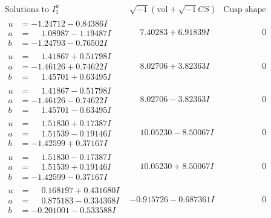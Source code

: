 \documentclass[1p]{elsarticle_modified}
\theoremstyle{definition}
\newcommand{\I}{\sqrt{-1}}
\begin{document}
$$\begin{array}{c|c|c}
 \end{array}$$\newpage$$\begin{array}{c|c|c}  
\text{Solutions to }I^u_{1}& \I (\text{vol} + \sqrt{-1}CS) & \text{Cusp shape}\\
 \hline 
\begin{aligned}
u &= -1.24712 - 0.84386 I \\
a &= \phantom{-}1.08987 - 1.19487 I \\
b &= -1.24793 - 0.76502 I\end{aligned}
 & \phantom{-}7.40283 + 6.91839 I & \phantom{-0.000000 } 0 \\ \hline\begin{aligned}
u &= \phantom{-}1.41867 + 0.51798 I \\
a &= -1.46126 + 0.74622 I \\
b &= \phantom{-}1.45701 + 0.63495 I\end{aligned}
 & \phantom{-}8.02706 + 3.82363 I & \phantom{-0.000000 } 0 \\ \hline\begin{aligned}
u &= \phantom{-}1.41867 - 0.51798 I \\
a &= -1.46126 - 0.74622 I \\
b &= \phantom{-}1.45701 - 0.63495 I\end{aligned}
 & \phantom{-}8.02706 - 3.82363 I & \phantom{-0.000000 } 0 \\ \hline\begin{aligned}
u &= \phantom{-}1.51830 + 0.17387 I \\
a &= \phantom{-}1.51539 - 0.19146 I \\
b &= -1.42599 + 0.37167 I\end{aligned}
 & \phantom{-}10.05230 - 8.50067 I & \phantom{-0.000000 } 0 \\ \hline\begin{aligned}
u &= \phantom{-}1.51830 - 0.17387 I \\
a &= \phantom{-}1.51539 + 0.19146 I \\
b &= -1.42599 - 0.37167 I\end{aligned}
 & \phantom{-}10.05230 + 8.50067 I & \phantom{-0.000000 } 0 \\ \hline\begin{aligned}
u &= \phantom{-}0.168197 + 0.431680 I \\
a &= \phantom{-}0.875183 - 0.334368 I \\
b &= -0.201001 - 0.533588 I\end{aligned}
 & -0.915726 - 0.687361 I & \phantom{-0.000000 } 0 \\ \hline\begin{aligned}

\end{aligned}
\end{array}$$
\end{document}
